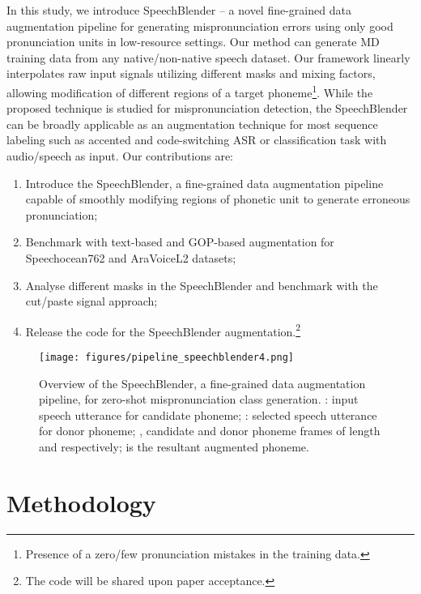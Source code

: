 \documentclass{INTERSPEECH2023}
\begin{document}
In this study, we introduce SpeechBlender – a novel fine-grained data augmentation pipeline for generating mispronunciation errors using only good pronunciation units in low-resource settings. Our method can generate MD training data from any native/non-native speech dataset. Our framework linearly interpolates raw input signals utilizing different masks and mixing factors, allowing modification of different regions of a target phoneme\footnote{Presence of a zero/few pronunciation mistakes in the training data.}. While the proposed technique is studied for mispronunciation detection, the SpeechBlender can be broadly applicable as an augmentation technique for most sequence labeling such as accented and code-switching ASR or classification task with audio/speech as input.
Our contributions are:
\vspace{-0.1cm}
\setlength\itemsep{-0.5em}
\begin{enumerate}[label=(\alph*)]
\item Introduce the SpeechBlender, a fine-grained data augmentation pipeline capable of smoothly modifying regions of phonetic unit to generate erroneous pronunciation; 
\item Benchmark with text-based and GOP-based augmentation for Speechocean762 and AraVoiceL2 datasets;
\item Analyse different masks in the SpeechBlender and benchmark with the cut/paste signal approach;
\item Release the code for the SpeechBlender augmentation.\footnote{The code will be shared upon paper acceptance.}
\end{enumerate}






\begin{figure}[!ht]
\centering
\texttt{[image: figures/pipeline\_speechblender4.png]}
\caption{Overview of the SpeechBlender, a fine-grained data augmentation pipeline, for zero-shot mispronunciation class generation. : input speech utterance for candidate phoneme; : selected speech utterance for donor phoneme; ,  candidate and donor phoneme frames of length  and  respectively;  is the resultant augmented phoneme.}
\label{fig:data_aug_pipeline}
\end{figure}

\section{Methodology} 
\label{sec:method}
\end{document}
